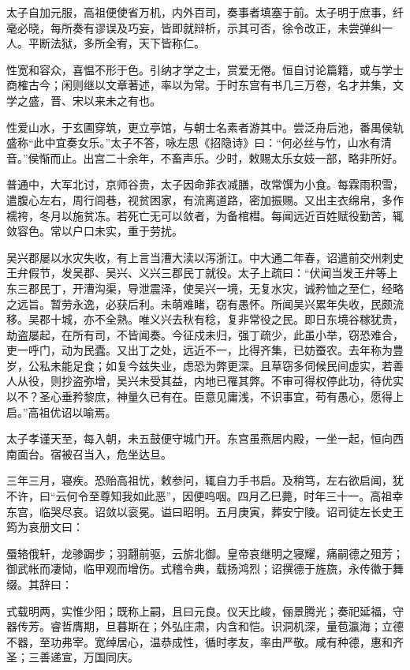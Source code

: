 \documentclass[12pt,UTF8]{ctexbook}
\begin{document}
太子自加元服，高祖便使省万机，内外百司，奏事者填塞于前。太子明于庶事，纤毫必晓，每所奏有谬误及巧妄，皆即就辩析，示其可否，徐令改正，未尝弹纠一人。平断法狱，多所全宥，天下皆称仁。

性宽和容众，喜愠不形于色。引纳才学之士，赏爱无倦。恒自讨论篇籍，或与学士商榷古今；闲则继以文章著述，率以为常。于时东宫有书几三万卷，名才并集，文学之盛，晋、宋以来未之有也。

性爱山水，于玄圃穿筑，更立亭馆，与朝士名素者游其中。尝泛舟后池，番禺侯轨盛称“此中宜奏女乐。”太子不答，咏左思《招隐诗》曰：“何必丝与竹，山水有清音。”侯惭而止。出宫二十余年，不畜声乐。少时，敕赐太乐女妓一部，略非所好。

普通中，大军北讨，京师谷贵，太子因命菲衣减膳，改常馔为小食。每霖雨积雪，遣腹心左右，周行闾巷，视贫困家，有流离道路，密加振赐。又出主衣绵帛，多作襦袴，冬月以施贫冻。若死亡无可以敛者，为备棺槥。每闻远近百姓赋役勤苦，辄敛容色。常以户口未实，重于劳扰。

吴兴郡屡以水灾失收，有上言当漕大渎以泻浙江。中大通二年春，诏遣前交州刺史王弁假节，发吴郡、吴兴、义兴三郡民丁就役。太子上疏曰：“伏闻当发王弁等上东三郡民丁，开漕沟渠，导泄震泽，使吴兴一境，无复水灾，诚矜恤之至仁，经略之远旨。暂劳永逸，必获后利。未萌难睹，窃有愚怀。所闻吴兴累年失收，民颇流移。吴郡十城，亦不全熟。唯义兴去秋有稔，复非常役之民。即日东境谷稼犹贵，劫盗屡起，在所有司，不皆闻奏。今征戍未归，强丁疏少，此虽小举，窃恐难合，吏一呼门，动为民蠹。又出丁之处，远近不一，比得齐集，已妨蚕农。去年称为豊岁，公私未能足食；如复今兹失业，虑恐为弊更深。且草窃多伺候民间虚实，若善人从役，则抄盗弥增，吴兴未受其益，内地已罹其弊。不审可得权停此功，待优实以不？圣心垂矜黎庶，神量久已有在。臣意见庸浅，不识事宜，苟有愚心，愿得上启。”高祖优诏以喻焉。

太子孝谨天至，每入朝，未五鼓便守城门开。东宫虽燕居内殿，一坐一起，恒向西南面台。宿被召当入，危坐达旦。

三年三月，寝疾。恐贻高祖忧，敕参问，辄自力手书启。及稍笃，左右欲启闻，犹不许，曰“云何令至尊知我如此恶”，因便呜咽。四月乙巳薨，时年三十一。高祖幸东宫，临哭尽哀。诏敛以衮冕。谥曰昭明。五月庚寅，葬安宁陵。诏司徒左长史王筠为哀册文曰：

蜃辂俄轩，龙骖跼步；羽翿前驱，云旂北御。皇帝哀继明之寝耀，痛嗣德之殂芳；御武帐而凄恸，临甲观而增伤。式稽令典，载扬鸿烈；诏撰德于旌旒，永传徽于舞缀。其辞曰：

式载明两，实惟少阳；既称上嗣，且曰元良。仪天比峻，俪景腾光；奏祀延福，守器传芳。睿哲膺期，旦暮斯在；外弘庄肃，内含和恺。识洞机深，量苞瀛海；立德不器，至功弗宰。宽绰居心，温恭成性，循时孝友，率由严敬。咸有种德，惠和齐圣；三善递宣，万国同庆。
\end{document}
